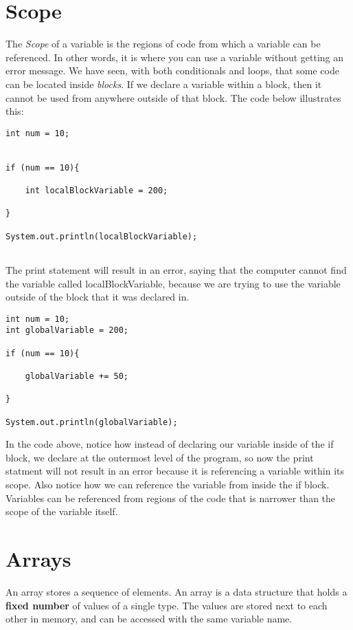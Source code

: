 \documentclass[14pt]{extreport}%
\begin{document}
\section*{Scope}
The \textit{Scope} of a variable is the regions of code from which a variable can be referenced. In other words, it is where you can use a variable without getting an error message. We have seen, with both conditionals and loops, that some code can be located inside \textit{blocks}. If we declare a variable within a block, then it cannot be used from anywhere outside of that block. The code below illustrates this:
\begin{lstlisting}
int num = 10;


if (num == 10){

    int localBlockVariable = 200;
    
}

System.out.println(localBlockVariable);
    
\end{lstlisting}{}
The print statement will result in an error, saying that the computer cannot find the variable called localBlockVariable, because we are trying to use the variable outside of the block that it was declared in.
\begin{lstlisting}
int num = 10;
int globalVariable = 200;

if (num == 10){

    globalVariable += 50;
    
}

System.out.println(globalVariable);
\end{lstlisting}{}
In the code above, notice how instead of declaring our variable inside of the if block, we declare at the outermost level of the program, so now the print statment will not result in an error because it is referencing a variable within its scope. Also notice how we can reference the variable from inside the if block. Variables can be referenced from regions of the code that is narrower than the scope of the variable itself.

\section*{Arrays}
An array stores a sequence of elements. An array is a data structure that
holds a \textbf{fixed number} of values of a single type. The values are stored next
to each other in memory, and can be accessed with the same variable name. 
\end{document}
